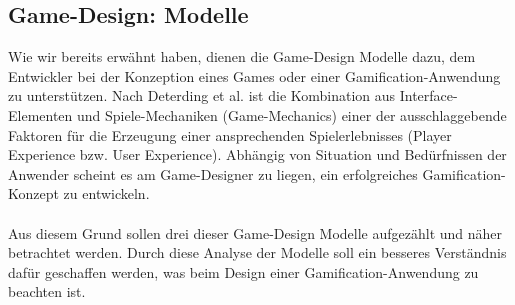 \documentclass[a4paper,12pt]{scrartcl}
\begin{document}
\subsection{Game-Design: Modelle}
\label{Game-Design Modelle}
Wie wir bereits erwähnt haben, dienen die Game-Design Modelle dazu, dem Entwickler bei der Konzeption eines Games oder einer Gamification-Anwendung zu unterstützen. Nach Deterding et al. \cite{Deterding2011} ist die Kombination aus Interface-Elementen und Spiele-Mechaniken (Game-Mechanics) einer der ausschlaggebende Faktoren für die Erzeugung einer ansprechenden Spielerlebnisses (Player Experience bzw. User Experience). Abhängig von Situation und Bedürfnissen der Anwender scheint es am Game-Designer zu liegen, ein erfolgreiches Gamification-Konzept zu entwickeln. 
\\\\
Aus diesem Grund sollen drei dieser Game-Design Modelle aufgezählt und näher betrachtet werden. Durch diese Analyse der Modelle soll ein besseres Verständnis dafür geschaffen werden, was beim Design einer Gamification-Anwendung zu beachten ist.
\end{document}
